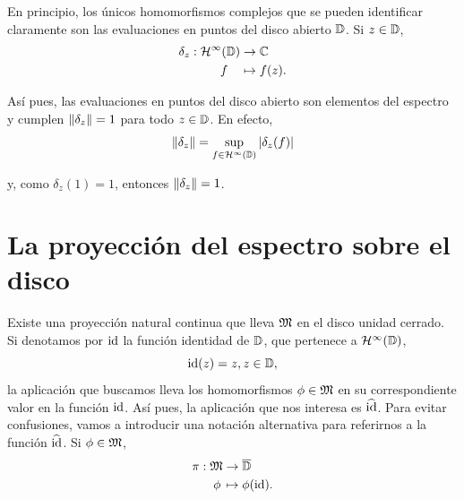 En principio, los únicos homomorfismos complejos que se pueden identificar claramente son las evaluaciones en puntos del disco abierto $\mathbb{D}$. Si $z \in \mathbb{D}$,
\begin{equation*}
    \begin{split}
        \delta_z: \mathcal{H}^{\infty}(\mathbb{D}) & \to  \mathbb{C} \\
                   f \, \, \, \, \, \, & \mapsto  f (z).
    \end{split}
\end{equation*}

Así pues, las evaluaciones en puntos del disco abierto son elementos del espectro y cumplen $\left\lVert\delta_z\right\rVert = 1$ para todo $z \in \mathbb{D}$. En efecto,
\begin{equation*}
    \left\lVert\delta_z\right\rVert = \sup_{f \in \mathcal{H}^{\infty}(\mathbb{D})} \left\lvert\delta_z(f)\right\rvert
\end{equation*}

y, como $\delta_z(1) = 1$, entonces $\left\lVert\delta_z\right\rVert=1$. \\

\section{La proyección del espectro sobre el disco}

Existe una proyección natural continua que lleva $\mathfrak{M}$ en el disco unidad cerrado. Si denotamos por $\operatorname{id}$ la función identidad de $\mathbb{D}$, que pertenece a $\mathcal{H}^{\infty}(\mathbb{D})$,
\begin{equation*}
    \operatorname{id}(z) = z, z \in \mathbb{D},
\end{equation*}
la aplicación que buscamos lleva los homomorfismos $\phi \in \mathfrak{M}$ en su correspondiente valor en la función $\operatorname{id}$. Así pues, la aplicación que nos interesa es $\widehat {\operatorname{id}}$. Para evitar confusiones, vamos a introducir una notación alternativa para referirnos a la función $\widehat {\operatorname{id}}$. Si $\phi \in \mathfrak{M}$,
\begin{equation}
    \label{eq:proyeccion}
    \begin{split}
        \pi: \mathfrak{M} & \to \overline{\mathbb{D}} \\
            \phi \, & \mapsto  \phi (\operatorname{id}).
    \end{split}
\end{equation}

